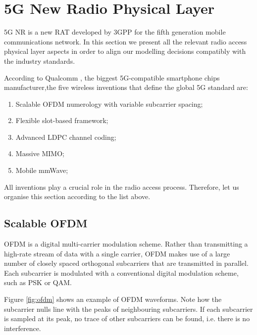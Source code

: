 \section{5G New Radio Physical Layer}
\label{sec:5gphy}


5G \ac{NR} is a new \ac{RAT} developed by \ac{3GPP} for the fifth generation mobile communications network. In this section we present all the relevant radio access physical layer aspects in order to align our modelling decisions compatibly with the industry standards.

According to Qualcomm \cite{qualcomm_innovative_five}, the biggest 5G-compatible smartphone chips manufacturer,the five wireless inventions that define the global 5G standard are:

\begin{enumerate}
    \item Scalable \acs{OFDM} numerology with variable subcarrier spacing;
    \item Flexible slot-based framework;
    \item Advanced \ac{LDPC} channel coding;
    \item Massive MIMO;
    \item Mobile mmWave;
\end{enumerate}

All inventions play a crucial role in the radio access process. Therefore, let us organise this section according to the list above. 


\subsection*{Scalable OFDM}

\ac{OFDM} is a digital multi-carrier modulation scheme. Rather than transmitting a high-rate stream of data with a single carrier, \ac{OFDM} makes use of a large number of closely spaced orthogonal subcarriers that are transmitted in parallel. Each subcarrier is modulated with a conventional digital modulation scheme, such as \ac{PSK} or \ac{QAM}. 

Figure \ref{fig:ofdm} shows an example of OFDM waveforms. Note how the subcarrier nulls line with the peaks of neighbouring subcarriers. If each subcarrier is sampled at its peak, no trace of other subcarriers can be found, i.e. there is no interference.



